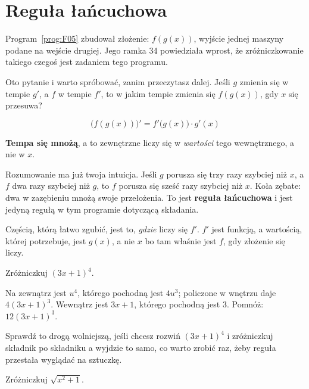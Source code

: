\section{Reguła łańcuchowa}
\label{sec:F12-chain}

\begin{fr}
Program~\ref{prog:F05} zbudował złożenie: $f(g(x))$, wyjście jednej maszyny
podane na wejście drugiej. Jego ramka 34 powiedziała wprost, że
zróżniczkowanie takiego czegoś jest zadaniem tego programu.

Oto pytanie i warto spróbować, zanim przeczytasz dalej. Jeśli $g$ zmienia się
w tempie $g'$, a $f$ w tempie $f'$, to w jakim tempie zmienia się $f(g(x))$,
gdy $x$ się przesuwa?
\dotline
\nextframe
\end{fr}

\begin{fr}
\begin{ansblock}
\[ \bigl(f(g(x))\bigr)' = f'\bigl(g(x)\bigr) \cdot g'(x) \]
\end{ansblock}

\textbf{Tempa się mnożą}, a to zewnętrzne liczy się w \emph{wartości} tego
wewnętrznego, a nie w $x$.

Rozumowanie ma już twoja intuicja. Jeśli $g$ porusza się trzy razy szybciej
niż $x$, a $f$ dwa razy szybciej niż $g$, to $f$ porusza się sześć razy
szybciej niż $x$. Koła zębate: dwa w zazębieniu mnożą swoje przełożenia. To
jest \textbf{reguła łańcuchowa} i jest jedyną regułą w tym programie
dotyczącą składania.

Częścią, którą łatwo zgubić, jest to, \emph{gdzie} liczy się $f'$. $f'$ jest
funkcją, a wartością, której potrzebuje, jest $g(x)$, a nie $x$ \dash{} bo
tam właśnie jest $f$, gdy złożenie się liczy.

Zróżniczkuj $(3x + 1)^{4}$.
\nextframe
\end{fr}

\begin{fr}
Na zewnątrz jest $u^{4}$, którego pochodną jest $4u^{3}$; policzone w
wnętrzu daje $4(3x+1)^{3}$. Wewnątrz jest $3x+1$, którego pochodną jest $3$.
Pomnóż: $12(3x+1)^{3}$.

Sprawdź to drogą wolniejszą, jeśli chcesz \dash{} rozwiń $(3x+1)^{4}$ i
zróżniczkuj składnik po składniku \dash{} a wyjdzie to samo, co warto zrobić
raz, żeby reguła przestała wyglądać na sztuczkę.

Zróżniczkuj $\sqrt{x^{2} + 1}$.
\nextframe
\end{fr}

